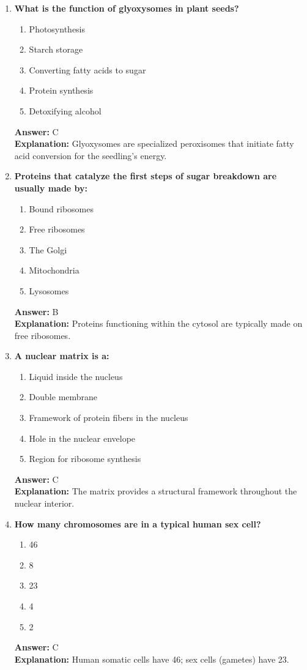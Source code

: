 \documentclass[11pt, a4paper]{article}
\begin{document}
\begin{enumerate}[leftmargin=*, label=\arabic*.]
\item \textbf{What is the function of glyoxysomes in plant seeds?}
\begin{enumerate}[label=\Alph*.]
\item Photosynthesis
\item Starch storage
\item Converting fatty acids to sugar
\item Protein synthesis
\item Detoxifying alcohol
\end{enumerate}
\textbf{Answer:} C \\
\textbf{Explanation:} Glyoxysomes are specialized peroxisomes that initiate fatty acid conversion for the seedling's energy.

\item \textbf{Proteins that catalyze the first steps of sugar breakdown are usually made by:}
\begin{enumerate}[label=\Alph*.]
\item Bound ribosomes
\item Free ribosomes
\item The Golgi
\item Mitochondria
\item Lysosomes
\end{enumerate}
\textbf{Answer:} B \\
\textbf{Explanation:} Proteins functioning within the cytosol are typically made on free ribosomes.

\item \textbf{A nuclear matrix is a:}
\begin{enumerate}[label=\Alph*.]
\item Liquid inside the nucleus
\item Double membrane
\item Framework of protein fibers in the nucleus
\item Hole in the nuclear envelope
\item Region for ribosome synthesis
\end{enumerate}
\textbf{Answer:} C \\
\textbf{Explanation:} The matrix provides a structural framework throughout the nuclear interior.

\item \textbf{How many chromosomes are in a typical human sex cell?}
\begin{enumerate}[label=\Alph*.]
\item 46
\item 8
\item 23
\item 4
\item 2
\end{enumerate}
\textbf{Answer:} C \\
\textbf{Explanation:} Human somatic cells have 46; sex cells (gametes) have 23.


\end{enumerate}
\end{document}
